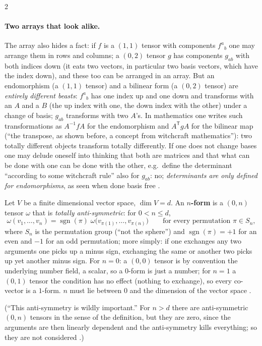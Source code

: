 \begin{paracol}{2}
\paragraph{Two arrays that look alike.} The array also hides a fact: if $f$ is a $(1,1)$ tensor with components $f^a{}_b$ one may arrange them in rows and columns; a $(0,2)$ tensor $g$ has components $g_{ab}$ with both indices down (it eats two vectors, in particular two basis vectors, which have the index down), and these too can be arranged in an array. But an endomorphism
(a $(1,1)$ tensor) and a bilinear form (a $(0,2)$ tensor) are \emph{entirely different beasts}: $f^a{}_b$ has one index up and one down and transforms with an $A$ and a $B$ (the up index with one, the down index with the other) under a change of basis; $g_{ab}$ transforms with two $A$'s. In mathematics one writes such transformations as
$A^{-1}fA$ for the endomorphism and $A^{\mathsf T}gA$ for the bilinear map (``the transpose, as shown before, a concept from witchcraft mathematics''): two totally different objects transform totally differently. If one does not change bases one may delude oneself into thinking that both are matrices and that what can be done with one
can be done with the other, e.g.\ define the determinant ``according to some witchcraft rule'' also for $g_{ab}$: no; \emph{determinants are only defined for endomorphisms}, as seen when done basis free
.

\begin{definition}\label{def:te-form}
Let $V$ be a finite dimensional vector space, $\dim V=d$. An \textbf{$n$-form} is a $(0,n)$ tensor $\omega$ that is \emph{totally anti-symmetric}: for $0<n\le d$,
\[
  \omega(v_1,\dots,v_n)=\operatorname{sgn}(\pi)\;\omega\bigl(v_{\pi(1)},\dots,v_{\pi(n)}\bigr)\qquad\text{for every permutation }\pi\in S_n,
\]
where $S_n$ is the permutation group (``not the sphere'') and $\operatorname{sgn}(\pi)=+1$ for an even and $-1$ for an odd permutation; more simply: if one exchanges any two arguments one picks up a minus sign, exchanging the same or another two picks up yet another minus sign. For $n=0$: a $(0,0)$ tensor is by convention
the underlying number field, a scalar, so a $0$-form is just a number; for $n=1$ a $(0,1)$ tensor the condition has no effect (nothing to exchange), so every co-vector is a $1$-form. $n$ must lie between $0$ and the dimension of the vector space .
\end{definition}
(``This anti-symmetry is wildly important.'' For $n>d$ there are anti-symmetric $(0,n)$ tensors in the sense of the definition, but they are zero, since the arguments are then linearly dependent and the anti-symmetry kills everything; so they are not considered .)


\end{paracol}
